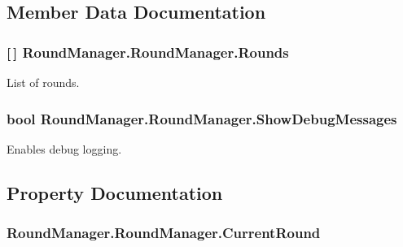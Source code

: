 \subsection{Member Data Documentation}
\hypertarget{class_round_manager_1_1_round_manager_aca52a7d7a2dc064d0db460fc1292a297}{}
\subsubsection[{Rounds}]{ \mbox{[}$\,$\mbox{]} Round\+Manager.\+Round\+Manager.\+Rounds}\label{class_round_manager_1_1_round_manager_aca52a7d7a2dc064d0db460fc1292a297}


List of rounds. 

\hypertarget{class_round_manager_1_1_round_manager_a3c6edeb40fd89225aad834d63a08f4d3}{}
\subsubsection[{Show\+Debug\+Messages}]{\setlength{\rightskip}{0pt plus 5cm}bool Round\+Manager.\+Round\+Manager.\+Show\+Debug\+Messages}\label{class_round_manager_1_1_round_manager_a3c6edeb40fd89225aad834d63a08f4d3}


Enables debug logging. 



\subsection{Property Documentation}
\hypertarget{class_round_manager_1_1_round_manager_ac51a28cf2f8981abda04a02a01a06d4f}{}
\subsubsection[{Current\+Round}]{ Round\+Manager.\+Round\+Manager.\+Current\+Round\hspace{0.3cm}{\ttfamily [get]}}\label{class_round_manager_1_1_round_manager_ac51a28cf2f8981abda04a02a01a06d4f}


